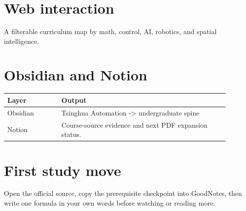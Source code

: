 \documentclass[11pt]{article}
\begin{document}
\section*{Web interaction}
A filterable curriculum map by math, control, AI, robotics, and spatial intelligence.

\section*{Obsidian and Notion}
\begin{tabular}{p{0.22\linewidth}p{0.68\linewidth}}
\toprule
Layer & Output \\
\midrule
Obsidian & Tsinghua Automation -> undergraduate spine \\
Notion & Course-source evidence and next PDF expansion status. \\
\bottomrule
\end{tabular}

\section*{First study move}
Open the official source, copy the prerequisite checkpoint into GoodNotes, then write one formula in your own words before watching or reading more.
\end{document}
